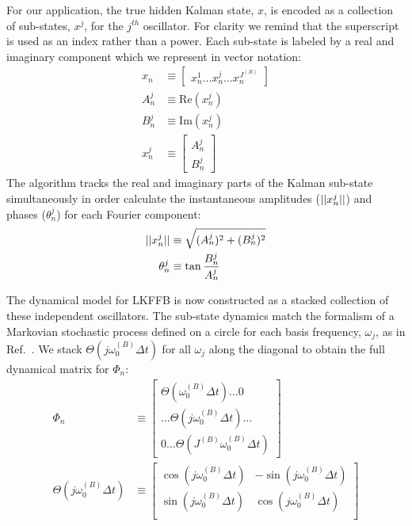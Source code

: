 For our application, the true hidden Kalman state, $x$, is encoded as a collection of sub-states, $x^j$, for the $j^{th}$ oscillator. For clarity we remind that the superscript is used as an index rather than a power.  Each sub-state is labeled by a real and imaginary component which we represent in vector notation: 
\begin{align}
x_n & \equiv \begin{bmatrix} x^{1}_{n} \hdots x^{j}_{n} \hdots x^{J^{(B)}}_{n} \end{bmatrix} \\
A^j_{n} & \equiv \textrm{Re}(x^{j}_{n}) \\
B^j_{n} & \equiv \textrm{Im}(x^{j}_{n}) \\
x^j_n & \equiv \begin{bmatrix} A^j_{n} \\ B^j_{n}  \end{bmatrix}
\end{align} 
The algorithm tracks the real and imaginary parts of the Kalman sub-state simultaneously in order calculate the instantaneous amplitudes ($||x^j_n||$) and phases ($\theta^{j}_{n}$)  for each Fourier component:
\begin{align}
||x^j_n|| & \equiv \sqrt{(A^j_{n})^2 + (B^j_{n})^2} \\
\theta^{j}_{n} & \equiv \tan{\frac{B^j_{n}}{A^j_{n}}}
\end{align}

The dynamical model for LKFFB is now constructed as a stacked collection of these independent oscillators. The sub-state dynamics match the formalism of a Markovian stochastic process defined on a circle for each basis frequency, $\omega_j$, as in Ref.~\cite{karlin1975first}. We stack $\Theta(j \omega_0^{(B)}\Delta t) $ for all $\omega_j$ along the diagonal to obtain the full dynamical matrix for $\Phi_n$:
\begin{align}
\Phi_{n} & \equiv \begin{bmatrix} 
\Theta(\omega_0^{(B)}\Delta t)\hdots 0  \\ 
 \hdots \Theta(j\omega_0^{(B)}\Delta t) \hdots \\
0 \hdots \Theta(J^{(B)} \omega_0^{(B)}\Delta t)  \end{bmatrix}\\ 
\Theta(j \omega_0^{(B)}\Delta t) &\equiv \begin{bmatrix} \cos(j \omega_0^{(B)}\Delta t) & -\sin(j \omega_0^{(B)}\Delta t) \\ \sin(j \omega_0^{(B)}\Delta t) & \cos(j \omega_0^{(B)}\Delta t) \\ \end{bmatrix} \label{eqn:ap_approxSP:LKFFB_Phi} 
\end{align}

